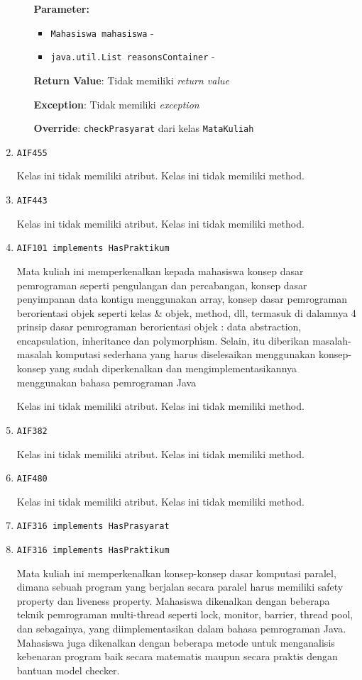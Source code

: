 \documentclass{article}
\begin{document}
\begin{enumerate}
\begin{itemize}
\textbf{Parameter:}
\begin{itemize}
\item \texttt{Mahasiswa mahasiswa} - 
\item \texttt{java.util.List reasonsContainer} - 
\end{itemize}
\textbf{Return Value}: Tidak memiliki \textit{return value}

\textbf{Exception}: Tidak memiliki \textit{exception}

\textbf{Override}: \texttt{checkPrasyarat} dari kelas \texttt{MataKuliah}

\end{itemize}
\item \texttt{AIF455}



Kelas ini tidak memiliki atribut. Kelas ini tidak memiliki method. \item \texttt{AIF443}



Kelas ini tidak memiliki atribut. Kelas ini tidak memiliki method. \item \texttt{AIF101 implements HasPraktikum}

Mata kuliah ini memperkenalkan kepada mahasiswa konsep dasar pemrograman 
 seperti pengulangan dan percabangan, konsep dasar penyimpanan data kontigu 
 menggunakan array, konsep dasar pemrograman berorientasi objek seperti kelas 
 \& objek, method, dll, termasuk di dalamnya 4 prinsip dasar pemrograman 
 berorientasi objek : data abstraction, encapsulation, inheritance dan 
 polymorphism. Selain, itu diberikan masalah-masalah komputasi sederhana 
 yang harus diselesaikan menggunakan konsep-konsep yang  sudah diperkenalkan 
 dan mengimplementasikannya menggunakan bahasa pemrograman Java

Kelas ini tidak memiliki atribut. Kelas ini tidak memiliki method. \item \texttt{AIF382}



Kelas ini tidak memiliki atribut. Kelas ini tidak memiliki method. \item \texttt{AIF480}



Kelas ini tidak memiliki atribut. Kelas ini tidak memiliki method. \item \texttt{AIF316 implements HasPrasyarat}

\item \texttt{AIF316 implements HasPraktikum}

Mata kuliah ini memperkenalkan konsep-konsep dasar komputasi paralel, dimana sebuah 
 program yang berjalan secara paralel harus memiliki safety property dan liveness property. 
 Mahasiswa dikenalkan dengan beberapa teknik pemrograman multi-thread
 seperti lock, monitor, barrier, thread pool, dan sebagainya, yang diimplementasikan 
 dalam bahasa pemrograman Java. Mahasiswa juga dikenalkan dengan beberapa metode untuk 
 menganalisis kebenaran program baik secara matematis maupun secara praktis dengan bantuan 
 model checker.


\end{enumerate}
\end{document}
